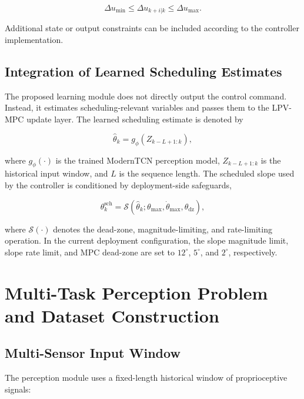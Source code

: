 \documentclass{ieeeaccess}
\begin{document}
\begin{equation}
\Delta u_{\min} \leq \Delta u_{k+i|k} \leq \Delta u_{\max}.
\label{eq:input_rate_constraint}
\end{equation}

Additional state or output constraints can be included according to the controller implementation.

\subsection{Integration of Learned Scheduling Estimates}

The proposed learning module does not directly output the control command. Instead, it estimates scheduling-relevant variables and passes them to the LPV-MPC update layer. The learned scheduling estimate is denoted by

\begin{equation}
\hat{\theta}_k = g_{\phi}(Z_{k-L+1:k}),
\label{eq:theta_estimator}
\end{equation}

where $g_{\phi}(\cdot)$ is the trained ModernTCN perception model, $Z_{k-L+1:k}$ is the historical input window, and $L$ is the sequence length. The scheduled slope used by the controller is conditioned by deployment-side safeguards,

\begin{equation}
\theta^{\mathrm{sch}}_k =
\mathcal{S}
\left(
\hat{\theta}_k;
\theta_{\max},
\dot{\theta}_{\max},
\theta_{\mathrm{dz}}
\right),
\label{eq:slope_conditioning}
\end{equation}

where $\mathcal{S}(\cdot)$ denotes the dead-zone, magnitude-limiting, and rate-limiting operation. In the current deployment configuration, the slope magnitude limit, slope rate limit, and MPC dead-zone are set to $12^{\circ}$, $5^{\circ}$, and $2^{\circ}$, respectively.

\section{Multi-Task Perception Problem and Dataset Construction}

\label{sec:dataset}

\subsection{Multi-Sensor Input Window}

The perception module uses a fixed-length historical window of proprioceptive signals:
\end{document}
